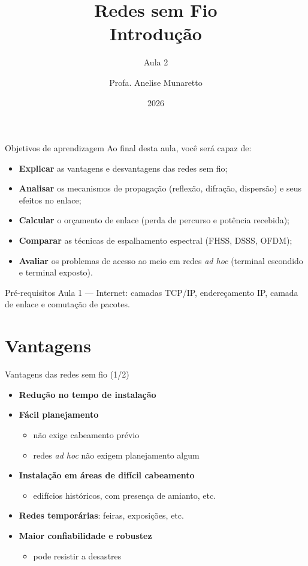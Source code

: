 \documentclass[aspectratio=169,11pt]{beamer}
\title[Redes sem Fio]{Redes sem Fio\\ Introdução}
\subtitle{Aula 2}
\author[Anelise Munaretto]{Profa. Anelise Munaretto}
\institute[Curso]{Redes sem Fio --- Ciência da Computação}
\date{2026}
\begin{document}
\begin{frame}[plain]
  \titlepage
\end{frame}

\begin{frame}{Objetivos de aprendizagem}
  Ao final desta aula, você será capaz de:
  \begin{itemize}
    \item \textbf{Explicar} as vantagens e desvantagens das redes sem fio;
    \item \textbf{Analisar} os mecanismos de propagação (reflexão, difração, dispersão) e seus efeitos no enlace;
    \item \textbf{Calcular} o orçamento de enlace (perda de percurso e potência recebida);
    \item \textbf{Comparar} as técnicas de espalhamento espectral (FHSS, DSSS, OFDM);
    \item \textbf{Avaliar} os problemas de acesso ao meio em redes \emph{ad hoc} (terminal escondido e terminal exposto).
  \end{itemize}
  \begin{alertblock}{Pré-requisitos}
    Aula 1 --- Internet: camadas TCP/IP, endereçamento IP, camada de enlace e comutação de pacotes.
  \end{alertblock}
\end{frame}

\section{Vantagens}

\begin{frame}{Vantagens das redes sem fio (1/2)}
  \begin{itemize}
    \item \textbf{Redução no tempo de instalação}
    \item \textbf{Fácil planejamento}
      \begin{itemize}
        \item não exige cabeamento prévio
        \item redes \emph{ad hoc} não exigem planejamento algum
      \end{itemize}
    \item \textbf{Instalação em áreas de difícil cabeamento}
      \begin{itemize}
        \item edifícios históricos, com presença de amianto, etc.
      \end{itemize}
    \item \textbf{Redes temporárias}: feiras, exposições, etc.
    \item \textbf{Maior confiabilidade e robustez}
      \begin{itemize}
        \item pode resistir a desastres
      \end{itemize}
  \end{itemize}
\end{frame}
\end{document}
